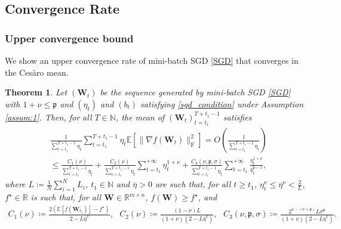 \documentclass[twoside,11pt]{article}
\newtheorem{thm}{Theorem}[section]
\begin{document}
\subsection{Convergence Rate}
\subsubsection{Upper convergence bound}
We show an upper convergence rate of mini-batch SGD \eqref{SGD} that converges in the Ces\`{a}ro mean.

\begin{thm}\label{thm:sgd_convergence_rate_upper}
Let $(\bm{W}_t)$ be the sequence generated by mini-batch SGD \eqref{SGD} with $1 + \nu \leq \mathfrak{p}$ and $(\eta_t)$ and $(b_t)$ satisfying \eqref{sgd_condition} under Assumption \ref{assum:1}. Then, for all $T \in \mathbb{N}$, the mean of $(\bm{W}_t)_{t = t_1}^{T + t_1 -1}$ satisfies 
\begin{align*}
&\frac{1}{\sum_{t= t_1}^{T + t_1 -1} \eta_t}
\sum_{t= t_1}^{T + t_1 -1} \eta_t 
\mathbb{E} [\| \nabla f (\bm{W}_t)\|_{\mathrm{F}}^2]
= O \left( \frac{1}{\sum_{t= t_1}^{T + t_1 -1} \eta_t} \right) \\
&\leq
\frac{C_1 (\nu)}{\sum_{t= t_1}^{T + t_1 -1} \eta_t}
+ \frac{C_2 (\nu)}{\sum_{t= t_1}^{T + t_1 -1} \eta_t} \sum_{t= t_1}^{+ \infty} \eta_t^{1 + \nu}
+ \frac{C_3 (\nu, \mathfrak{p}, \sigma)}{\sum_{t= t_1}^{T + t_1 -1} \eta_t} \sum_{t= t_1}^{+ \infty} \frac{\eta_t^{1 + \nu}}{b_t^{\mathfrak{p}-1}},
\end{align*}
where $L \coloneqq \frac{1}{N} \sum_{i=1}^N L_i$, $t_1 \in \mathbb{N}$ and $\overline{\eta} > 0$ are such that, for all $t \geq t_1$, $\eta_t^\nu \leq \overline{\eta}^\nu < \frac{2}{L}$, $f^\star \in \mathbb{R}$ is such that, for all $\bm{W} \in \mathbb{R}^{m \times n}$, $f(\bm{W}) \geq f^\star$, and 
\begin{align*}
C_1 (\nu) \coloneqq \frac{2(\mathbb{E} [f(\bm{W}_{t_1})] - f^{\star})}{2 - L \overline{\eta}^\nu}, \text{ }
C_2 (\nu) \coloneqq \frac{(1 - \nu) L}{(1 + \nu)(2 - L \overline{\eta}^\nu)}, \text{ } 
C_3 (\nu, \mathfrak{p}, \sigma) \coloneqq \frac{2^{4 - (\nu + \mathfrak{p})} L \sigma^{\mathfrak{p}}}{(1 + \nu)(2 - L \overline{\eta}^\nu)}.
\end{align*}
\end{thm}
\end{document}
